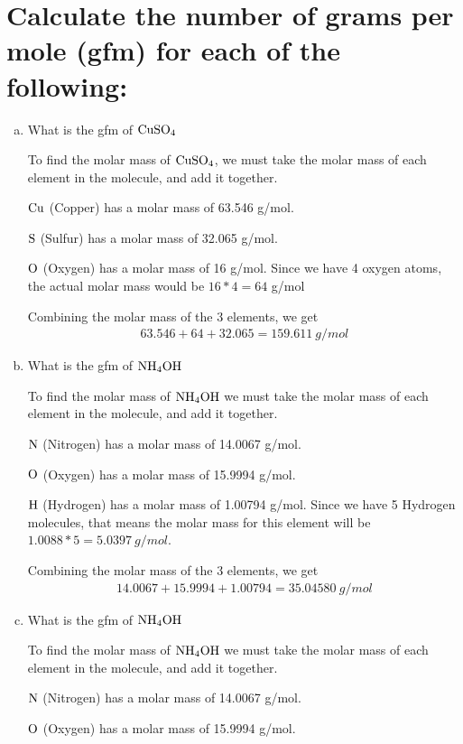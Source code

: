 \documentclass[11pt]{article}
\begin{document}
\section{Calculate the number of grams per mole (gfm) for each of the following:}
\label{sec:orgf44609b}
\begin{enumerate}[(a)]
\item What is the gfm of \(\ce{CuSO4}\)

To find the molar mass of \(\ce{CuSO4}\), we must take the molar mass of
each element in the molecule, and add it together.

\(\ce{Cu}\) (Copper) has a molar mass of 63.546 g/mol.

\(\ce{S}\) (Sulfur) has a molar mass of 32.065 g/mol.

\(\ce{O}\) (Oxygen) has a molar mass of 16 g/mol. Since we have 4 oxygen
atoms, the actual molar mass would be \(16*4=64\) g/mol

Combining the molar mass of the 3 elements, we get
\begin{align*}
63.546+64+32.065=159.611\ g/mol
\end{align*}

\item What is the gfm of \(\ce{NH4OH}\)

To find the molar mass of \(\ce{NH4OH}\) we must take the molar mass of each element in the molecule, and add it together.

\(\ce{N}\) (Nitrogen) has a molar mass of 14.0067 g/mol.

\(\ce{O}\) (Oxygen) has a molar mass of 15.9994 g/mol.

\(\ce{H}\) (Hydrogen) has a molar mass of 1.00794 g/mol. Since we have 5
Hydrogen molecules, that means the molar mass for this element will be
\(1.0088*5=5.0397\ g/mol\).

Combining the molar mass of the 3 elements, we get
\begin{align*}
14.0067+15.9994+1.00794=35.04580\ g/mol
\end{align*}

\item What is the gfm of \(\ce{NH4OH}\)

To find the molar mass of \(\ce{NH4OH}\) we must take the molar mass of each element in the molecule, and add it together.

\(\ce{N}\) (Nitrogen) has a molar mass of 14.0067 g/mol.

\(\ce{O}\) (Oxygen) has a molar mass of 15.9994 g/mol.


\end{enumerate}
\end{document}
